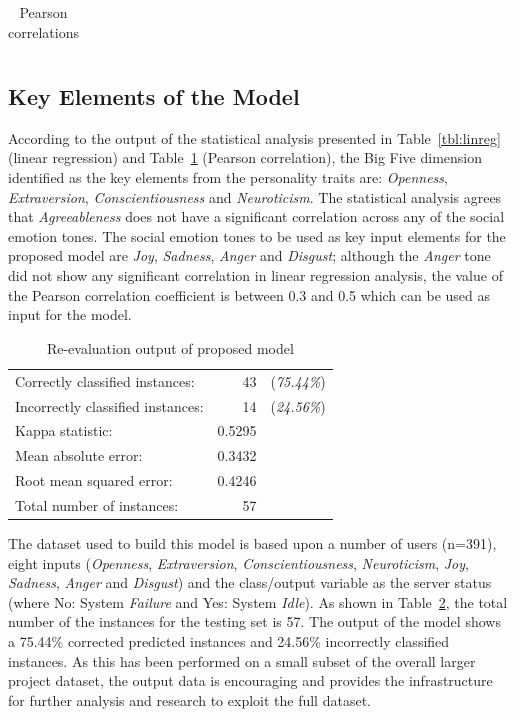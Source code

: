 \documentclass[graybox]{svmult}
\begin{document}
{{{\begin{table}[!ht]
\begin{tabular}{@{}rrrrrr@{}}
\bottomrule
\end{tabular}
\caption{Pearson correlations}
\label{tab:pearson}
\end{table}


\subsection{Key Elements of the Model}

According to the output of the statistical analysis presented in
Table~\ref{tbl:linreg} (linear regression) and Table~\ref{tab:pearson}
(Pearson correlation), the Big Five dimension identified as the key
elements from the personality traits are: {\emph{Openness}},
{\emph{Extraversion}}, {\emph{Conscientiousness}} and
{\emph{Neuroticism}}. The statistical analysis agrees that
{\emph{Agreeableness}} does not have a significant correlation across
any of the social emotion tones. The social emotion tones to be used
as key input elements for the proposed model are {\emph{Joy}},
{\emph{Sadness}}, {\emph{Anger}} and {\emph{Disgust}}; although the
{\emph{Anger}} tone did not show any significant correlation in linear
regression analysis, the value of the Pearson correlation coefficient
is between 0.3 and 0.5 which can be used as input for the model.

\begin{table}[!ht]
\centering
\begin{tabular}{lrr}
Correctly classified instances:   & 43     & ({\emph{75.44\%}}) \\
Incorrectly classified instances: & 14     & ({\emph{24.56\%}}) \\
Kappa statistic:                  & 0.5295 &         \\
Mean absolute error:              & 0.3432 &         \\
Root mean squared error:          & 0.4246 &         \\
Total number of instances:        & 57     &        
\end{tabular}
\caption{Re-evaluation output of proposed model}
\label{tab:reeval}
\end{table}

The dataset used to build this model is based upon a number of users
(n=391), eight inputs ({\emph{Openness}}, {\emph{Extraversion}},
{\emph{Conscientiousness}}, {\emph{Neuroticism}}, {\emph{Joy}},
{\emph{Sadness}}, {\emph{Anger}} and {\emph{Disgust}}) and the
class/output variable as the server status (where No: System
{\emph{Failure}} and Yes: System {\emph{Idle}}). As shown in
Table~\ref{tab:reeval}, the total number of the instances for the
testing set is 57. The output of the model shows a 75.44\% corrected
predicted instances and 24.56\% incorrectly classified instances. As
this has been performed on a small subset of the overall larger
project dataset, the output data is encouraging and provides the
infrastructure for further analysis and research to exploit the full
dataset.


}}}
\end{document}
